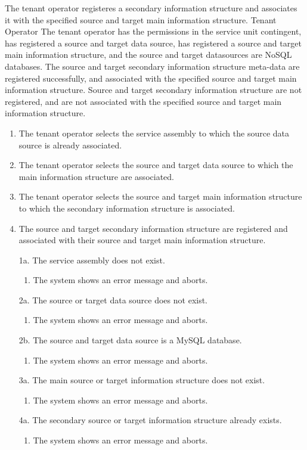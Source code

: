{The tenant operator registeres a secondary information structure and associates it with the specified source and target main information structure.}
{Tenant Operator}
{The tenant operator has the permissions in the service unit contingent, has registered a source and target data source, has registered a source and target main information structure, and the source and target datasources are \ac{NoSQL} databases.}
{The source and target secondary information structure meta-data are registered successfully, and associated with the specified source and target main information structure.}
{Source and target secondary information structure are not registered, and are not associated with the specified source and target main information structure.}
{\begin{enumerate}
	\item The tenant operator selects the service assembly to which the source data source is already associated.
	\item The tenant operator selects the source and target data source to which the main information structure are associated.
	\item The tenant operator selects the source and target main information structure to which the secondary information structure is associated.
	\item The source and target secondary information structure are registered and associated with their source and target main information structure.
\end{enumerate}}
{\begin{enumerate}
	\item[1a.] The service assembly does not exist.
		\begin{enumerate}
			\item The system shows an error message and aborts.
		\end{enumerate}
	\item[2a.] The source or target data source does not exist.
		\begin{enumerate}
			\item The system shows an error message and aborts.
		\end{enumerate}
	\item[2b.] The source and target data source is a MySQL database.
		\begin{enumerate}
			\item The system shows an error message and aborts.
		\end{enumerate}
	\item[3a.] The main source or target information structure does not exist.
		\begin{enumerate}
			\item The system shows an error message and aborts.
		\end{enumerate}
	\item[4a.] The secondary source or target information structure already exists.
		\begin{enumerate}
			\item The system shows an error message and aborts.
		\end{enumerate}
\end{enumerate}}



\FloatBarrier